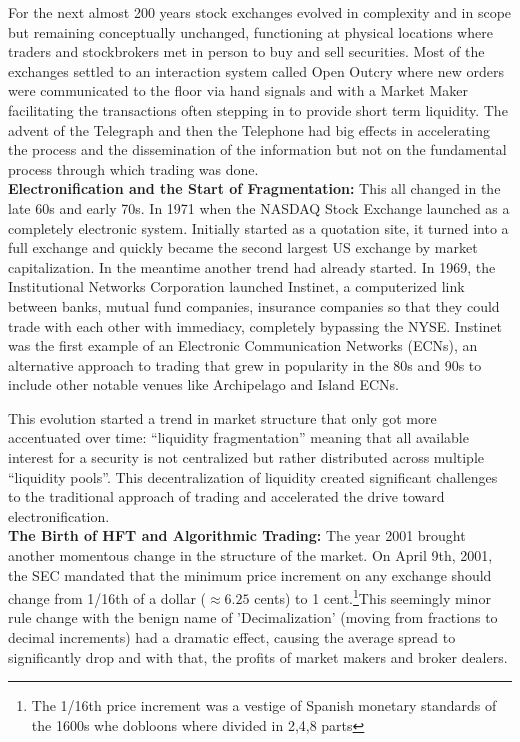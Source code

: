 For the next almost 200 years stock exchanges evolved in complexity and in scope but remaining conceptually unchanged, functioning at physical locations where traders and stockbrokers met in person to buy and sell securities. Most of the exchanges settled to an interaction system called Open Outcry where new orders were communicated to the floor via hand signals and with a Market Maker facilitating the transactions often stepping in to provide short term liquidity. The advent of the Telegraph and then the Telephone had big effects in accelerating the process and the dissemination of the information but not on the fundamental process through which trading was done. \\


\noindent\textbf{Electronification and the Start of Fragmentation:} This all changed in the late 60s and early 70s. In 1971 when the NASDAQ Stock Exchange launched as a completely electronic system. Initially started as a quotation site, it turned into a full exchange  and  quickly became the second largest US exchange by market capitalization. 
In the meantime another trend had already started. In 1969, the Institutional Networks Corporation launched Instinet, a computerized link between banks, mutual fund companies, insurance companies so that they could trade with each other with immediacy, completely bypassing the NYSE.  Instinet was the first example of an Electronic Communication Networks (ECNs), an alternative approach to trading that grew in popularity in the 80s and 90s to include other notable venues like Archipelago and Island ECNs.

This evolution started a trend in market structure that only got more accentuated over time: ``liquidity fragmentation'' meaning that all available interest for a security is not centralized but rather distributed across multiple ``liquidity pools''.  This decentralization of liquidity created significant challenges to the traditional approach of trading and accelerated the drive toward electronification. \\


\noindent\textbf{The Birth of HFT and Algorithmic Trading:} The year 2001 brought another momentous change in the structure of the market. On April 9th, 2001, the SEC mandated that the minimum price increment on any exchange should change from 1/16th of a dollar ($\approx6.25$ cents) to 1 cent.\footnote{ The 1/16th price increment was a vestige of Spanish monetary standards of the 1600s whe dobloons where divided in 2,4,8 parts}This seemingly  minor rule change with the benign name of 'Decimalization' (moving from fractions to decimal increments) had a dramatic effect, causing the average spread to significantly drop and with that, the profits of market makers and broker dealers.
 
